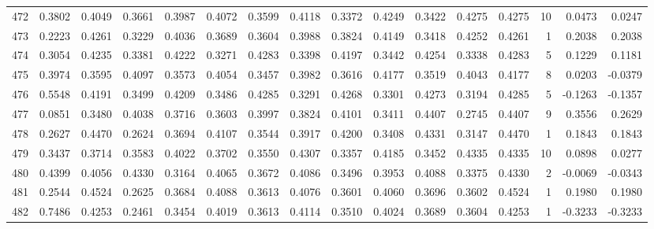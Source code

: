 \begin{tabular}{lrrrrrrrrrrrrrrr}
472 &      0.3802 &  0.4049 &  0.3661 &  0.3987 &  0.4072 &  0.3599 &  0.4118 &  0.3372 &  0.4249 &  0.3422 &   0.4275 &     0.4275 &     10 &                    0.0473 &                     0.0247 \\
473 &      0.2223 &  0.4261 &  0.3229 &  0.4036 &  0.3689 &  0.3604 &  0.3988 &  0.3824 &  0.4149 &  0.3418 &   0.4252 &     0.4261 &      1 &                    0.2038 &                     0.2038 \\
474 &      0.3054 &  0.4235 &  0.3381 &  0.4222 &  0.3271 &  0.4283 &  0.3398 &  0.4197 &  0.3442 &  0.4254 &   0.3338 &     0.4283 &      5 &                    0.1229 &                     0.1181 \\
475 &      0.3974 &  0.3595 &  0.4097 &  0.3573 &  0.4054 &  0.3457 &  0.3982 &  0.3616 &  0.4177 &  0.3519 &   0.4043 &     0.4177 &      8 &                    0.0203 &                    -0.0379 \\
476 &      0.5548 &  0.4191 &  0.3499 &  0.4209 &  0.3486 &  0.4285 &  0.3291 &  0.4268 &  0.3301 &  0.4273 &   0.3194 &     0.4285 &      5 &                   -0.1263 &                    -0.1357 \\
477 &      0.0851 &  0.3480 &  0.4038 &  0.3716 &  0.3603 &  0.3997 &  0.3824 &  0.4101 &  0.3411 &  0.4407 &   0.2745 &     0.4407 &      9 &                    0.3556 &                     0.2629 \\
478 &      0.2627 &  0.4470 &  0.2624 &  0.3694 &  0.4107 &  0.3544 &  0.3917 &  0.4200 &  0.3408 &  0.4331 &   0.3147 &     0.4470 &      1 &                    0.1843 &                     0.1843 \\
479 &      0.3437 &  0.3714 &  0.3583 &  0.4022 &  0.3702 &  0.3550 &  0.4307 &  0.3357 &  0.4185 &  0.3452 &   0.4335 &     0.4335 &     10 &                    0.0898 &                     0.0277 \\
480 &      0.4399 &  0.4056 &  0.4330 &  0.3164 &  0.4065 &  0.3672 &  0.4086 &  0.3496 &  0.3953 &  0.4088 &   0.3375 &     0.4330 &      2 &                   -0.0069 &                    -0.0343 \\
481 &      0.2544 &  0.4524 &  0.2625 &  0.3684 &  0.4088 &  0.3613 &  0.4076 &  0.3601 &  0.4060 &  0.3696 &   0.3602 &     0.4524 &      1 &                    0.1980 &                     0.1980 \\
482 &      0.7486 &  0.4253 &  0.2461 &  0.3454 &  0.4019 &  0.3613 &  0.4114 &  0.3510 &  0.4024 &  0.3689 &   0.3604 &     0.4253 &      1 &                   -0.3233 &                    -0.3233 \\

\end{tabular}
